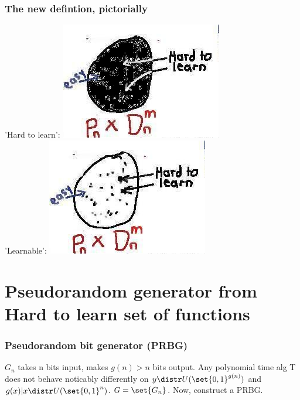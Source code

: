 \documentclass{beamer}
\begin{document}
\begin{frame}
\frametitle{The new defintion, pictorially}
'Hard to learn': \includegraphics[scale=0.25]{images/hardToLearnDefnNew.jpg}\\
'Learnable': \includegraphics[scale=0.25]{images/hardToLearnDefnProb.jpg}
\end{frame}

\section{Pseudorandom generator from Hard to learn set of functions}
\begin{frame}
\frametitle{Pseudorandom bit generator (PRBG)}
\begin{itemize}
\pitem $G_{n}$ takes n bits input, makes $g(n)>n$ bits output.
\pitem Any polynomial time alg T does not behave noticably differently on $y \distr U(\set{0, 1}^{g(n)})$ and $g(x)| x \distr U(\set{0, 1}^{n})$.
\pitem $G = \set{G_{n}}$.
\pitem Now, construct a PRBG.
\end{itemize}
\end{frame}
\end{document}
